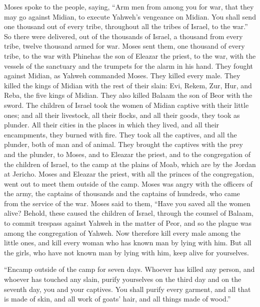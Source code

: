  Moses spoke to the people, saying, ``Arm men from among you
for war, that they may go against Midian, to execute Yahweh's vengeance
on Midian.  You shall send one thousand out of every tribe,
throughout all the tribes of Israel, to the war.''  So there
were delivered, out of the thousands of Israel, a thousand from every
tribe, twelve thousand armed for war.  Moses sent them, one
thousand of every tribe, to the war with Phinehas the son of Eleazar the
priest, to the war, with the vessels of the sanctuary and the trumpets
for the alarm in his hand.  They fought against Midian, as
Yahweh commanded Moses. They killed every male.  They killed
the kings of Midian with the rest of their slain: Evi, Rekem, Zur, Hur,
and Reba, the five kings of Midian. They also killed Balaam the son of
Beor with the sword.  The children of Israel took the women
of Midian captive with their little ones; and all their livestock, all
their flocks, and all their goods, they took as plunder. 
All their cities in the places in which they lived, and all their
encampments, they burned with fire.  They took all the
captives, and all the plunder, both of man and of animal. 
They brought the captives with the prey and the plunder, to Moses, and
to Eleazar the priest, and to the congregation of the children of
Israel, to the camp at the plains of Moab, which are by the Jordan at
Jericho.  Moses and Eleazar the priest, with all the
princes of the congregation, went out to meet them outside of the camp.
 Moses was angry with the officers of the army, the
captains of thousands and the captains of hundreds, who came from the
service of the war.  Moses said to them, ``Have you saved
all the women alive?  Behold, these caused the children of
Israel, through the counsel of Balaam, to commit trespass against Yahweh
in the matter of Peor, and so the plague was among the congregation of
Yahweh.  Now therefore kill every male among the little
ones, and kill every woman who has known man by lying with him.
 But all the girls, who have not known man by lying with
him, keep alive for yourselves.

 ``Encamp outside of the camp for seven days. Whoever has
killed any person, and whoever has touched any slain, purify yourselves
on the third day and on the seventh day, you and your captives.
 You shall purify every garment, and all that is made of
skin, and all work of goats' hair, and all things made of wood.''

